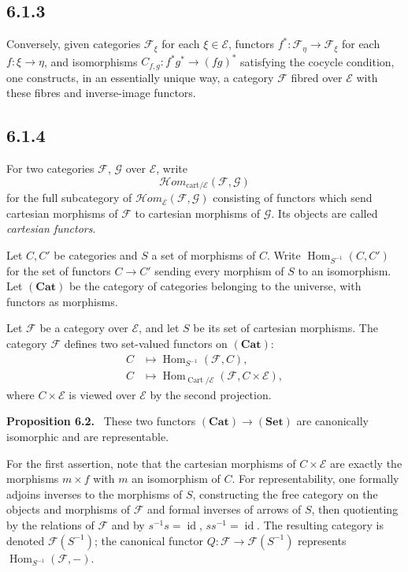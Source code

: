 \documentclass[11pt]{article}
\newcommand{\E}{\mathcal{E}}
\newcommand{\F}{\mathcal{F}}
\newcommand{\G}{\mathcal{G}}
\newcommand{\Ens}{\mathbf{Set}}
\newcommand{\Cat}{\mathbf{Cat}}
\newcommand{\Hom}{\operatorname{Hom}}
\newcommand{\id}{\operatorname{id}}
\newcommand{\Cart}{\operatorname{Cart}}
\newenvironment{statement}[1]{\par\medskip\noindent\textbf{#1.}\ }{\par\medskip}
\begin{document}
\subsection*{6.1.3}
Conversely, given categories \(\F_\xi\) for each \(\xi\in\E\), functors \(f^*:\F_\eta\to\F_\xi\) for each \(f:\xi\to\eta\), and isomorphisms \(C_{f,g}:f^*g^*\to(fg)^*\) satisfying the cocycle condition, one constructs, in an essentially unique way, a category \(\F\) fibred over \(\E\) with these fibres and inverse-image functors.

\subsection*{6.1.4}
For two categories \(\F\), \(\G\) over \(\E\), write
\[
 \mathcal{H}om_{\mathrm{cart}/\E}(\F,\G)
\]
for the full subcategory of \(\mathcal{H}om_\E(\F,\G)\) consisting of functors which send cartesian morphisms of \(\F\) to cartesian morphisms of \(\G\). Its objects are called \emph{cartesian functors}.

Let \(C,C'\) be categories and \(S\) a set of morphisms of \(C\). Write \(\Hom_{S^{-1}}(C,C')\) for the set of functors \(C\to C'\) sending every morphism of \(S\) to an isomorphism. Let \((\Cat)\) be the category of categories belonging to the universe, with functors as morphisms.

Let \(\F\) be a category over \(\E\), and let \(S\) be its set of cartesian morphisms. The category \(\F\) defines two set-valued functors on \((\Cat)\):
\begin{align*}
C&\longmapsto \Hom_{S^{-1}}(\F,C),\\
C&\longmapsto \Hom_{\Cart/\E}(\F,C\times\E),
\end{align*}
where \(C\times\E\) is viewed over \(\E\) by the second projection.

\begin{statement}{Proposition 6.2}
These two functors \((\Cat)\to(\Ens)\) are canonically isomorphic and are representable.
\end{statement}

For the first assertion, note that the cartesian morphisms of \(C\times\E\) are exactly the morphisms \(m\times f\) with \(m\) an isomorphism of \(C\). For representability, one formally adjoins inverses to the morphisms of \(S\), constructing the free category on the objects and morphisms of \(\F\) and formal inverses of arrows of \(S\), then quotienting by the relations of \(\F\) and by \(s^{-1}s=\id\), \(ss^{-1}=\id\). The resulting category is denoted \(\F(S^{-1})\); the canonical functor \(Q:\F\to\F(S^{-1})\) represents \(\Hom_{S^{-1}}(\F,-)\).
\end{document}
